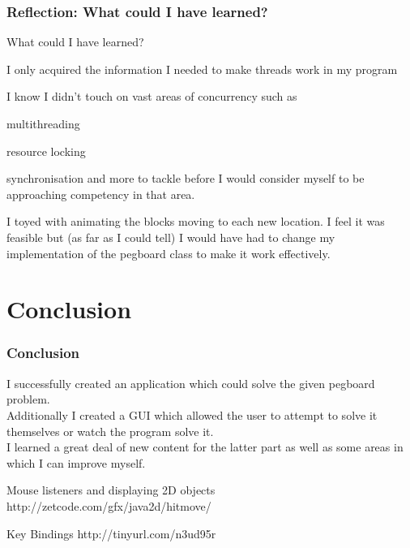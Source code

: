 \documentclass{beamer}
\begin{document}
	\begin{frame}
		\frametitle{Reflection: What could I have learned?}
		What could I have learned?
		\blt
			\item I only acquired the information I needed to make threads work in my program
			\item I know I didn't touch on vast areas of concurrency such as
			\blt
				\item multithreading
				\item resource locking
				\item synchronisation
			\finblt 
			and more to tackle before I would consider myself to be approaching competency in that area. 
			\item I toyed with animating the blocks moving to each new location. I feel it was 
			feasible but (as far as I could tell) I would have had to change my implementation of the 
			pegboard class to make it work effectively. 
		\finblt
	\end{frame}
\section{Conclusion}	
	\begin{frame}
		\frametitle{Conclusion}
		I successfully created an application which could solve the given pegboard problem.\\\medskip
		Additionally I created a GUI which allowed the user to attempt to solve it themselves
		or watch the program solve it. \\\medskip
		I learned a great deal of new content for the latter part as well as some areas in which I can improve myself. 
		
		\bd{Resources:}
		\blt 
			\item Mouse listeners and displaying 2D objects http://zetcode.com/gfx/java2d/hitmove/
			\item Key Bindings http://tinyurl.com/n3ud95r
		\finblt
	\end{frame}
\end{document}
